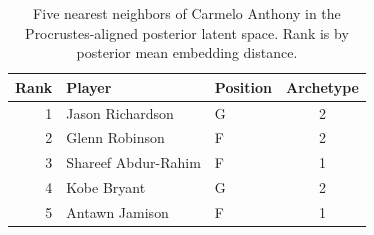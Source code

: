 \begin{table}[htbp]
  \centering\small
  \begin{tabular}{rllc}
    \toprule
    Rank & Player & Position & Archetype \\
    \midrule
    1 & Jason Richardson & G & 2 \\
    2 & Glenn Robinson & F & 2 \\
    3 & Shareef Abdur-Rahim & F & 1 \\
    4 & Kobe Bryant & G & 2 \\
    5 & Antawn Jamison & F & 1 \\
    \bottomrule
  \end{tabular}
  \caption{Five nearest neighbors of Carmelo Anthony in the Procrustes-aligned posterior latent space. Rank is by posterior mean embedding distance.}
  \label{tab:Carmelo_Anthony_neighbors}
\end{table}


